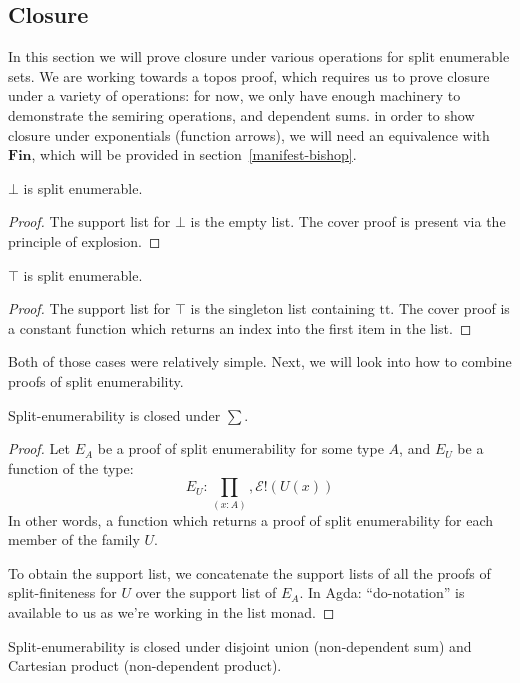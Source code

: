 \subsection{Closure}
In this section we will prove closure under various operations for split
enumerable sets.
We are working towards a topos proof, which requires us to prove closure under
a variety of operations: for now, we only have enough machinery to demonstrate
the semiring operations, and dependent sums.
in order to show closure under exponentials (function arrows), we will need an
equivalence with \(\mathbf{Fin}\), which will be provided in
section~\ref{manifest-bishop}.
\begin{rm-lemma}
  \(\bot\) is split enumerable.
\end{rm-lemma}
\begin{proof}
  The support list for \(\bot\) is the empty list.
  The cover proof is present via the principle of explosion.
\end{proof}
\begin{rm-lemma}
  \(\top\) is split enumerable.
\end{rm-lemma}
\begin{proof}
  The support list for \(\top\) is the singleton list containing \(\text{tt}\).
  The cover proof is a constant function which returns an index into the first
  item in the list.
\end{proof}
Both of those cases were relatively simple.
Next, we will look into how to combine proofs of split enumerability.
\begin{rm-theorem}
  Split-enumerability is closed under \(\sum\).
\end{rm-theorem}
\begin{proof}
  Let \(E_A\) be a proof of split enumerability for some type \(A\), and \(E_U\)
  be a function of the type:
  \begin{equation}
    E_U : \prod_{(x : A)} , \mathcal{E}!(U(x))
  \end{equation}
  In other words, a function which returns a proof of split enumerability for
  each member of the family \(U\).

  To obtain the support list, we concatenate the support lists of all the proofs
  of split-finiteness for \(U\) over the support list of \(E_A\).
  In Agda:
  ``do-notation'' is available to us as we're working in the list monad.
\end{proof}
\begin{rm-lemma}
  Split-enumerability is closed under disjoint union (non-dependent sum) and
  Cartesian product (non-dependent product).
\end{rm-lemma}
